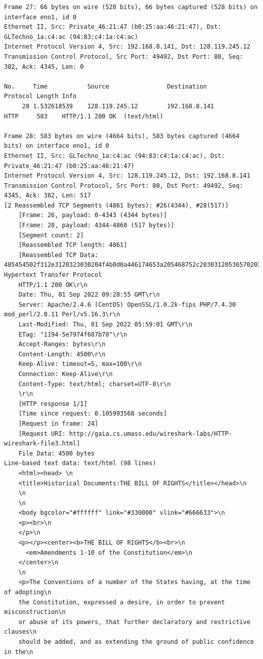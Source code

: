 \documentclass[a4paper,11pt,final]{report}
\begin{document}
\begin{lstlisting}[breaklines]
Frame 27: 66 bytes on wire (528 bits), 66 bytes captured (528 bits) on interface eno1, id 0
Ethernet II, Src: Private_46:21:47 (b0:25:aa:46:21:47), Dst: GLTechno_1a:c4:ac (94:83:c4:1a:c4:ac)
Internet Protocol Version 4, Src: 192.168.8.141, Dst: 128.119.245.12
Transmission Control Protocol, Src Port: 49492, Dst Port: 80, Seq: 382, Ack: 4345, Len: 0

No.     Time           Source                Destination           Protocol Length Info
     28 1.532618539    128.119.245.12        192.168.8.141         HTTP     583    HTTP/1.1 200 OK  (text/html)

Frame 28: 583 bytes on wire (4664 bits), 583 bytes captured (4664 bits) on interface eno1, id 0
Ethernet II, Src: GLTechno_1a:c4:ac (94:83:c4:1a:c4:ac), Dst: Private_46:21:47 (b0:25:aa:46:21:47)
Internet Protocol Version 4, Src: 128.119.245.12, Dst: 192.168.8.141
Transmission Control Protocol, Src Port: 80, Dst Port: 49492, Seq: 4345, Ack: 382, Len: 517
[2 Reassembled TCP Segments (4861 bytes): #26(4344), #28(517)]
    [Frame: 26, payload: 0-4343 (4344 bytes)]
    [Frame: 28, payload: 4344-4860 (517 bytes)]
    [Segment count: 2]
    [Reassembled TCP length: 4861]
    [Reassembled TCP Data: 485454502f312e3120323030204f4b0d0a446174653a205468752c203031205365702032…]
Hypertext Transfer Protocol
    HTTP/1.1 200 OK\r\n
    Date: Thu, 01 Sep 2022 09:28:55 GMT\r\n
    Server: Apache/2.4.6 (CentOS) OpenSSL/1.0.2k-fips PHP/7.4.30 mod_perl/2.0.11 Perl/v5.16.3\r\n
    Last-Modified: Thu, 01 Sep 2022 05:59:01 GMT\r\n
    ETag: "1194-5e7974f687b78"\r\n
    Accept-Ranges: bytes\r\n
    Content-Length: 4500\r\n
    Keep-Alive: timeout=5, max=100\r\n
    Connection: Keep-Alive\r\n
    Content-Type: text/html; charset=UTF-8\r\n
    \r\n
    [HTTP response 1/1]
    [Time since request: 0.105993568 seconds]
    [Request in frame: 24]
    [Request URI: http://gaia.cs.umass.edu/wireshark-labs/HTTP-wireshark-file3.html]
    File Data: 4500 bytes
Line-based text data: text/html (98 lines)
    <html><head> \n
    <title>Historical Documents:THE BILL OF RIGHTS</title></head>\n
    \n
    \n
    <body bgcolor="#ffffff" link="#330000" vlink="#666633">\n
    <p><br>\n
    </p>\n
    <p></p><center><b>THE BILL OF RIGHTS</b><br>\n
      <em>Amendments 1-10 of the Constitution</em>\n
    </center>\n
    \n
    <p>The Conventions of a number of the States having, at the time of adopting\n
    the Constitution, expressed a desire, in order to prevent misconstruction\n
    or abuse of its powers, that further declaratory and restrictive clauses\n
    should be added, and as extending the ground of public confidence in the\n

\end{lstlisting}
\end{document}
